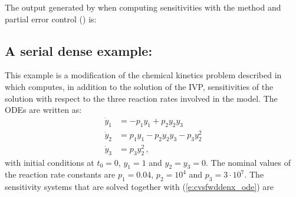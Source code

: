 
The output generated by  when computing sensitivities with the 
method and partial error control () is:


\newpage
\subsection{A serial dense example: }
\label{ss:cvsfwddenx}

This example is a modification of the chemical kinetics problem described 
in~\cite{cvode2.4.0_ex} which computes, in addition to the solution of the
IVP, sensitivities of the solution with respect to the three reaction rates 
involved in the model. The ODEs are written as:
\begin{equation}\label{e:cvsfwddenx_ode}
  \begin{split}
    {\dot y}_1 &= -p_1 y_1 + p_2 y_2 y_3   \\
    {\dot y}_2 &=  p_1 y_1 - p_2 y_2 y_3 - p_3 y_2^2 \\
    {\dot y}_3 &=  p_3 y_2^2 \, ,
  \end{split}
\end{equation}
with initial conditions at $t_0 = 0$, $y_1 = 1$ and $y_2 = y_3 = 0$. 
The nominal values of the reaction rate constants are 
$p_1 = 0.04$, $p_2 = 10^4$ and $p_3 = 3\cdot 10^7$.
The sensitivity systems that are solved together with (\ref{e:cvsfwddenx_ode}) are
